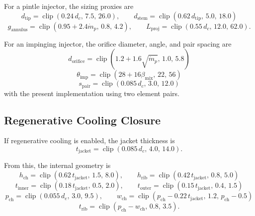 \documentclass[11pt]{article}
\newcommand{\clip}{\operatorname{clip}}
\newcommand{\mdotp}{\dot{m}_{p}}
\begin{document}
For a pintle injector, the sizing proxies are
\begin{equation}
d_{\text{tip}}=\clip(0.24\,d_c,\,7.5,\,26.0),
\qquad
d_{\text{stem}}=\clip(0.62\,d_{\text{tip}},\,5.0,\,18.0)
\label{eq:pintle-dia}
\end{equation}
\begin{equation}
g_{\text{annulus}}=\clip(0.95+2.4\mdotp,\,0.8,\,4.2),
\qquad
L_{\text{proj}}=\clip(0.55\,d_c,\,12.0,\,62.0).
\label{eq:pintle-geometry}
\end{equation}

For an impinging injector, the orifice diameter, angle, and pair spacing are
\begin{equation}
d_{\text{orifice}}=\clip\!\left(1.2+1.6\sqrt{\mdotp},\,1.0,\,5.8\right)
\label{eq:impinging-orifice}
\end{equation}
\begin{equation}
\theta_{\text{imp}}=\clip(28+16\beta_{\text{mix}},\,22,\,56)
\label{eq:impinging-angle}
\end{equation}
\begin{equation}
s_{\text{pair}}=\clip(0.085\,d_c,\,3.0,\,12.0)
\label{eq:pair-spacing}
\end{equation}
with the present implementation using two element pairs.

\subsection{Regenerative Cooling Closure}
If regenerative cooling is enabled, the jacket thickness is
\begin{equation}
t_{\text{jacket}}=\clip(0.085\,d_c,\,4.0,\,14.0).
\label{eq:jacket}
\end{equation}

From this, the internal geometry is
\begin{equation}
h_{\text{ch}}=\clip(0.62\,t_{\text{jacket}},\,1.5,\,8.0),
\qquad
h_{\text{rib}}=\clip(0.42\,t_{\text{jacket}},\,0.8,\,5.0)
\label{eq:regen-channel-depth}
\end{equation}
\begin{equation}
t_{\text{inner}}=\clip(0.18\,t_{\text{jacket}},\,0.5,\,2.0),
\qquad
t_{\text{outer}}=\clip(0.15\,t_{\text{jacket}},\,0.4,\,1.5)
\label{eq:regen-wall-thickness}
\end{equation}
\begin{equation}
p_{\text{ch}}=\clip(0.055\,d_e,\,3.0,\,9.5),
\qquad
w_{\text{ch}}=\clip\!\left(p_{\text{ch}}-0.22\,t_{\text{jacket}},\,1.2,\,p_{\text{ch}}-0.5\right)
\label{eq:regen-pitch-width}
\end{equation}
\begin{equation}
t_{\text{rib}}=\clip(p_{\text{ch}}-w_{\text{ch}},\,0.8,\,3.5).
\label{eq:regen-rib}
\end{equation}
\end{document}
